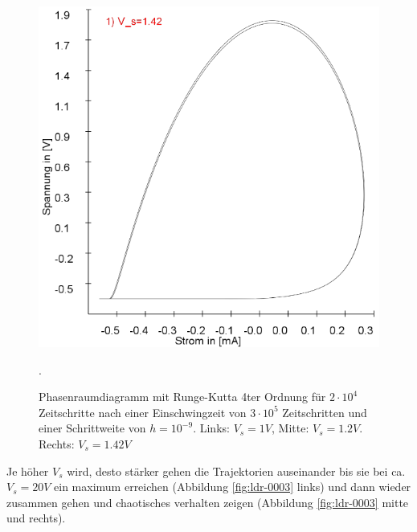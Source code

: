 \documentclass{scrartcl}
\begin{document}
\begin{figure}
\includegraphics[scale=0.28]{schwing-runge-nach300k-weitere20k-10-9-1,42V}
\caption{Phasenraumdiagramm mit Runge-Kutta 4ter Ordnung für $2\cdot10^4$ Zeitschritte nach einer Einschwingzeit von  $3\cdot10^5$ Zeitschritten und einer Schrittweite von $h=10^{-9}$. Links: $V_s=1V$, Mitte: $V_s=1.2V$. Rechts: $V_s=1.42V$}. 
\label{fig:ldr-0002}
\end{figure}
Je höher $V_s$ wird, desto stärker gehen die Trajektorien auseinander bis sie bei ca. $V_s=20V$ ein maximum erreichen (Abbildung \ref{fig:ldr-0003} links) und dann wieder zusammen gehen und chaotisches verhalten zeigen (Abbildung \ref{fig:ldr-0003} mitte und rechts).
\end{document}
